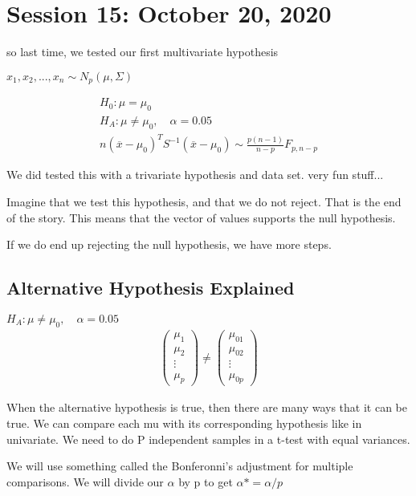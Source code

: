 \chapter{Session 15: October 20, 2020}

so last time, we tested our first multivariate hypothesis

$x_1,x_2,...,x_n \sim N_p(\mu,\Sigma)$

\begin{gather*}
    H_0: \mu = \mu_0\\
    H_A : \mu \neq \mu_0, \quad \alpha = 0.05 \\
    n(\overline{x} - \mu_0)^T S^{-1} (\overline{x} - \mu_0) \sim \frac{p(n-1)}{n-p}F_{p,n-p}
\end{gather*}

We did tested this with a trivariate hypothesis and data set. very fun stuff...

Imagine that we test this hypothesis, and that we do not reject. That is the end of the story. This means that the vector of values supports the null hypothesis.

If we do end up rejecting the null hypothesis, we have more steps.

\section{Alternative Hypothesis Explained}
$ H_A : \mu \neq \mu_0, \quad \alpha = 0.05 $
\begin{gather*}
    \begin{pmatrix}
    \mu_1 \\
    \mu_2 \\
    \vdots \\
    \mu_p
    \end{pmatrix}
    \neq
    \begin{pmatrix}
    \mu_{01}\\
    \mu_{02} \\
    \vdots \\
    \mu_{0p}
    \end{pmatrix}
\end{gather*}

When the alternative hypothesis is true, then there are many ways that it can be true. We can compare each mu with its corresponding hypothesis like in univariate. We need to do P independent samples in a t-test with equal variances.

We will use something called the Bonferonni's adjustment for multiple comparisons. We will divide our $\alpha$ by p to get $\alpha* = \alpha/p$

